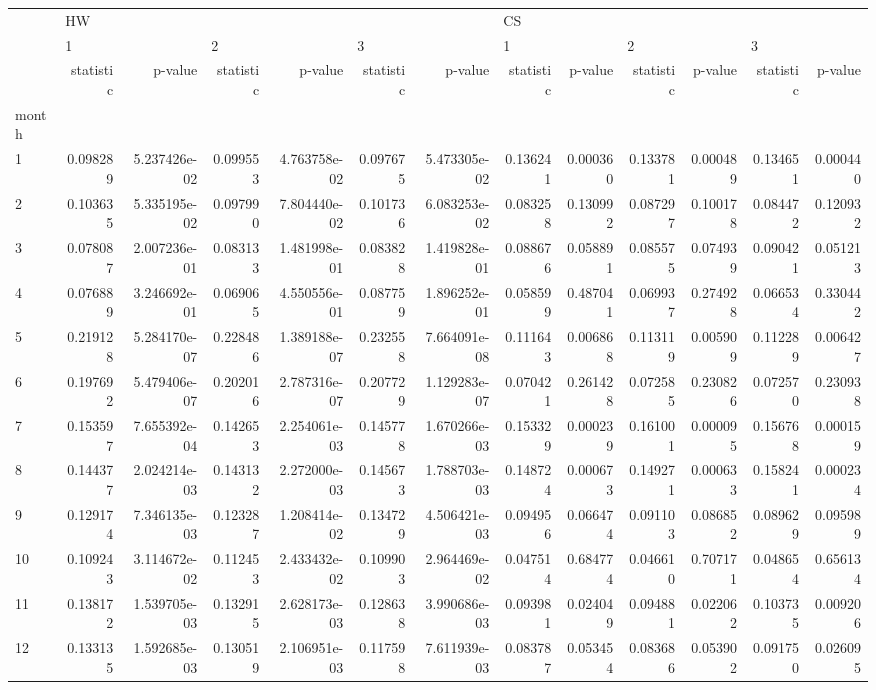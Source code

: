 \begin{tabular}{lrrrrrrrrrrrr}
\toprule
{} & \multicolumn{6}{l}{HW} & \multicolumn{6}{l}{CS} \\
{} & \multicolumn{2}{l}{1} & \multicolumn{2}{l}{2} & \multicolumn{2}{l}{3} & \multicolumn{2}{l}{1} & \multicolumn{2}{l}{2} & \multicolumn{2}{l}{3} \\
{} & statistic &       p-value & statistic &       p-value & statistic &       p-value & statistic &   p-value & statistic &   p-value & statistic &   p-value \\
month &           &               &           &               &           &               &           &           &           &           &           &           \\
\midrule
1     &  0.098289 &  5.237426e-02 &  0.099553 &  4.763758e-02 &  0.097675 &  5.473305e-02 &  0.136241 &  0.000360 &  0.133781 &  0.000489 &  0.134651 &  0.000440 \\
2     &  0.103635 &  5.335195e-02 &  0.097990 &  7.804440e-02 &  0.101736 &  6.083253e-02 &  0.083258 &  0.130992 &  0.087297 &  0.100178 &  0.084472 &  0.120932 \\
3     &  0.078087 &  2.007236e-01 &  0.083133 &  1.481998e-01 &  0.083828 &  1.419828e-01 &  0.088676 &  0.058891 &  0.085575 &  0.074939 &  0.090421 &  0.051213 \\
4     &  0.076889 &  3.246692e-01 &  0.069065 &  4.550556e-01 &  0.087759 &  1.896252e-01 &  0.058599 &  0.487041 &  0.069937 &  0.274928 &  0.066534 &  0.330442 \\
5     &  0.219128 &  5.284170e-07 &  0.228486 &  1.389188e-07 &  0.232558 &  7.664091e-08 &  0.111643 &  0.006868 &  0.113119 &  0.005909 &  0.112289 &  0.006427 \\
6     &  0.197692 &  5.479406e-07 &  0.202016 &  2.787316e-07 &  0.207729 &  1.129283e-07 &  0.070421 &  0.261428 &  0.072585 &  0.230826 &  0.072570 &  0.230938 \\
7     &  0.153597 &  7.655392e-04 &  0.142653 &  2.254061e-03 &  0.145778 &  1.670266e-03 &  0.153329 &  0.000239 &  0.161001 &  0.000095 &  0.156768 &  0.000159 \\
8     &  0.144377 &  2.024214e-03 &  0.143132 &  2.272000e-03 &  0.145673 &  1.788703e-03 &  0.148724 &  0.000673 &  0.149271 &  0.000633 &  0.158241 &  0.000234 \\
9     &  0.129174 &  7.346135e-03 &  0.123287 &  1.208414e-02 &  0.134729 &  4.506421e-03 &  0.094956 &  0.066474 &  0.091103 &  0.086852 &  0.089629 &  0.095989 \\
10    &  0.109243 &  3.114672e-02 &  0.112453 &  2.433432e-02 &  0.109903 &  2.964469e-02 &  0.047514 &  0.684774 &  0.046610 &  0.707171 &  0.048654 &  0.656134 \\
11    &  0.138172 &  1.539705e-03 &  0.132915 &  2.628173e-03 &  0.128638 &  3.990686e-03 &  0.093981 &  0.024049 &  0.094881 &  0.022062 &  0.103735 &  0.009206 \\
12    &  0.133135 &  1.592685e-03 &  0.130519 &  2.106951e-03 &  0.117598 &  7.611939e-03 &  0.083787 &  0.053454 &  0.083686 &  0.053902 &  0.091750 &  0.026095 \\
\bottomrule
\end{tabular}

